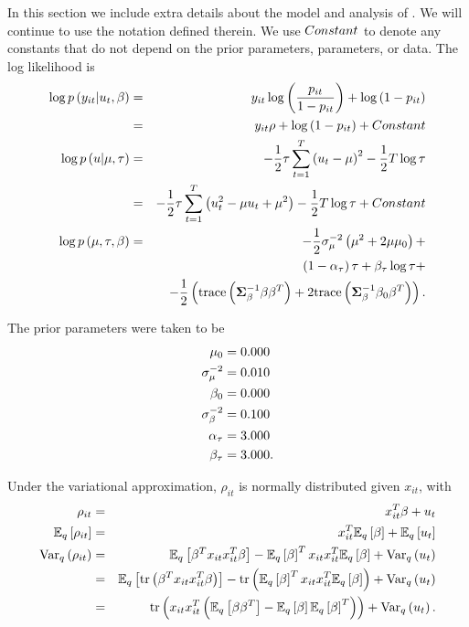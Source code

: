 \documentclass{article}\usepackage[]{graphicx}\usepackage[]{color}
\theoremstyle{definition}
\theoremstyle{plain}
\theoremstyle{plain}
\theoremstyle{plain}
\theoremstyle{definition}
\theoremstyle{plain}
\theoremstyle{plain}
\begin{document}
In this section we include extra details about the model and analysis
of . We will continue to use the notation
defined therein. We use $Constant$ to denote any constants that do not depend
on the prior parameters, parameters, or data. The log likelihood is
\begin{eqnarray}
\log p\left(y_{it}\vert u_{t},\beta\right) & = &
    y_{it}\log\left(\frac{p_{it}}{1-p_{it}}\right)+
    \log\left(1-p_{it}\right)\nonumber \\
 & = & y_{it}\rho+\log\left(1-p_{it}\right)+Constant\nonumber \\
\log p\left(u\vert\mu,\tau\right) & = &
    -\frac{1}{2}\tau\sum_{t=1}^{T}\left(u_{t}-\mu\right)^{2}-
    \frac{1}{2}T\log\tau\nonumber \\
 & = & -\frac{1}{2}\tau\sum_{t=1}^{T}\left(u_{t}^{2}-\mu u_{t}+
    \mu^{2}\right)-\frac{1}{2}T\log\tau+Constant\nonumber \\
\log p\left(\mu,\tau,\beta\right) & = &
    -\frac{1}{2}\sigma_{\mu}^{-2}\left(\mu^{2}+2\mu\mu_{0}\right)+\nonumber \\
 &  & \left(1-\alpha_{\tau}\right)\tau+\beta_{\tau}\log\tau+\nonumber \\
 &  & -\frac{1}{2}\left(\textrm{trace}\left(
    \boldsymbol{\Sigma}_{\beta}^{-1}\beta\beta^{T}\right)+2\textrm{trace}
    \left(\boldsymbol{\Sigma}_{\beta}^{-1}\beta_{0}\beta^{T}\right)\right).
    \label{eq:glmm_log_lik}
\end{eqnarray}

The prior parameters were taken to be
\begin{align*}
\mu_{0} & =0.000\\
\sigma_{\mu}^{-2} & =0.010\\
\beta_{0} & =0.000\\
\sigma_{\beta}^{-2} & =0.100\\
\alpha_{\tau} & =3.000\\
\beta_{\tau} & =3.000.
\end{align*}

Under the variational approximation, $\rho_{it}$ is normally distributed
given $x_{it}$, with
\begin{eqnarray*}
\rho_{it} & = & x_{it}^{T}\beta+u_{t}\\
\mathbb{E}_{q}\left[\rho_{it}\right] & = &
    x_{it}^{T}\mathbb{E}_{q}\left[\beta\right]+\mathbb{E}_{q}\left[u_{t}\right]\\
\textrm{Var}_{q}\left(\rho_{it}\right) & = &
    \mathbb{E}_{q}\left[\beta^{T}x_{it}x_{it}^{T}\beta\right]-
    \mathbb{E}_{q}\left[\beta\right]^{T}x_{it}x_{it}^{T}\mathbb{E}_{q}
    \left[\beta\right]+\textrm{Var}_{q}\left(u_{t}\right)\\
 & = & \mathbb{E}_{q}\left[\textrm{tr}\left(\beta^{T}x_{it}x_{it}^{T}
    \beta\right)\right]-\textrm{tr}\left(\mathbb{E}_{q}
    \left[\beta\right]^{T}x_{it}x_{it}^{T}\mathbb{E}_{q}\left[\beta\right]\right)+
    \textrm{Var}_{q}\left(u_{t}\right)\\
 & = & \textrm{tr}\left(x_{it}x_{it}^{T}\left(\mathbb{E}_{q}
    \left[\beta\beta^{T}\right]-\mathbb{E}_{q}\left[\beta\right]\mathbb{E}_{q}
    \left[\beta\right]^{T}\right)\right)+\textrm{Var}_{q}\left(u_{t}\right).
\end{eqnarray*}
\end{document}
